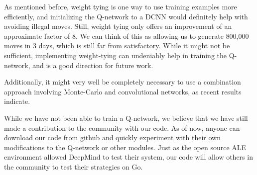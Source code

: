 As mentioned before, weight tying is one way to use training examples more efficiently, and initializing the Q-network to a DCNN would definitely help with avoiding illegal moves. Still, weight tying only offers an improvement of an approximate factor of 8. We can think of this as allowing us to generate 800,000 moves in 3 days, which is still far from satisfactory. While it might not be sufficient, implementing weight-tying can undeniably help in training the Q-network, and is a good direction for future work.

Additionally, it might very well be completely necessary to use a combination approach involving Monte-Carlo and convolutional networks, as recent results indicate. 

While we have not been able to train a Q-network, we believe that we have still made a contribution to the community with our code. As of now, anyone can download our code from github and quickly experiment with their own modifications to the Q-network or other modules. Just as the open source ALE environment allowed DeepMind to test their system, our code will allow others in the community to test their strategies on Go.